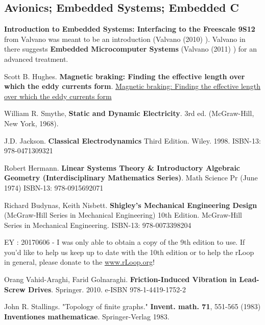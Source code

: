 \documentclass[10pt]{amsart}
\begin{document}
\begin{multicols*}{2}
\part{Avionics; Embedded Systems; Embedded C}  

\textbf{Introduction to Embedded Systems: Interfacing to the Freescale 9S12} from Valvano was meant to be an introduction (Valvano (2010) \cite{Valv2010}).  Valvano in there suggests \textbf{Embedded Microcomputer Systems} (Valvano (2011) \cite{Valv2011}) for an advanced treatment.  





\end{multicols*}

\begin{thebibliography}{9}


Scott B. Hughes.  \textbf{Magnetic braking: Finding the effective length over which the eddy currents form}.  
\href{https://drive.google.com/file/d/0Bwo3W0v5P04LX29XT2NFeVY0a1E/view}{Magnetic braking: Finding the effective length over which the eddy currents form}  


William R. Smythe, \textbf{Static and Dynamic Electricity}.  3rd ed. (McGraw-Hill, New York, 1968).  

J.D. Jackson.  \textbf{Classical Electrodynamics} Third Edition.  Wiley.  1998.   ISBN-13: 978-0471309321

Robert Hermann.  \textbf{Linear Systems Theory \& Introductory Algebraic Geometry (Interdisciplinary Mathematics Series)}.  Math Science Pr (June 1974)
ISBN-13: 978-0915692071

Richard Budynas, Keith Nisbett.  \textbf{Shigley's Mechanical Engineering Design} (McGraw-Hill Series in Mechanical Engineering) 10th Edition.  McGraw-Hill Series in Mechanical Engineering.  ISBN-13: 978-0073398204

EY : 20170606 -  I was only able to obtain a copy of the 9th edition to use.  If you'd like to help us keep up to date with the 10th edition or to help the rLoop in general, please donate to the \href{rLoop}{www.rLoop.org}!

Orang Vahid-Araghi, Farid Golnaraghi.  \textbf{Friction-Induced Vibration in Lead-Screw Drives}.  Springer.  2010.  e-ISBN 978-1-4419-1752-2



John R. Stallings.  "Topology of finite graphs."  \textbf{Invent. math. 71}, 551-565 (1983)  \textbf{Inventiones mathematicae}.  Springer-Verlag 1983.  


\end{thebibliography}
\end{document}
